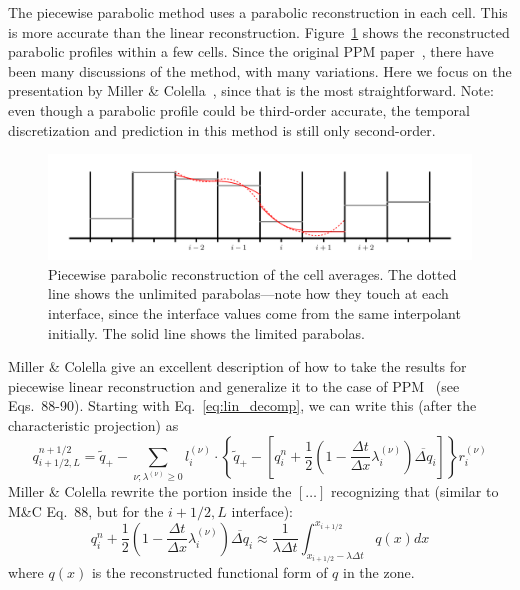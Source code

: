 \label{sec:hydro:ppm}

The piecewise parabolic method uses a parabolic reconstruction in each
cell.  This is more accurate than the linear reconstruction.
Figure~\ref{fig:ppm} shows the reconstructed parabolic profiles within
a few cells.  Since the original PPM
paper~\cite{colellawoodward:1984}, there have been many discussions of
the method, with many variations.  Here we focus on the presentation
by Miller \& Colella~\cite{millercolella:2002}, since that is the most
straightforward.  Note: even though a parabolic profile could be
third-order accurate, the temporal discretization and prediction in
this method is still only second-order.
%
\begin{figure}[t]
\centering
\includegraphics[width=\linewidth]{piecewise-parabolic}
\caption[Piecewise parabolic reconstruction of the cell
  averages]{\label{fig:ppm} Piecewise parabolic reconstruction of the
  cell averages.  The dotted line shows the unlimited parabolas---note
  how they touch at each interface, since the interface values come
  from the same interpolant initially.  The solid line shows the
  limited parabolas.}
\end{figure}


Miller \& Colella give an excellent description of how to take the
results for piecewise linear reconstruction and generalize it to the case of
PPM~\cite{colellawoodward:1984} (see Eqs.\ 88-90).  Starting with
Eq.~\ref{eq:lin_decomp}, we can write this (after the characteristic
projection) as
\begin{equation}
q_{i+1/2,L}^{n+1/2} = \tilde{q}_+ -
   \sum_{\nu;\lambda^{(\nu)}\ge 0} l_i^{(\nu)} \cdot \left \{
        \tilde{q}_+ - \left [ q_i^n +
            \frac{1}{2} \left ( 1 - \frac{\Delta t}{\Delta x} \lambda_i^{(\nu)} \right ) \overline{\Delta q}_i \right ]
       \right \} r_i^{(\nu)}
\end{equation}
Miller \& Colella rewrite the portion inside the $[\ldots]$
recognizing that (similar to M\&C Eq.\ 88, but for the $i+1/2,L$ interface):
\begin{equation}
  q_i^n + \frac{1}{2} \left (1 - \frac{\Delta t}{\Delta x} \lambda_i^{(\nu)} \right ) \overline{\Delta q}_i
  \approx \frac{1}{\lambda \Delta t} \int_{x_{i+1/2} - \lambda \Delta t}^{x_{i+1/2}}
           q(x) dx
\end{equation}
where $q(x)$ is the reconstructed functional form of $q$ in the zone.

